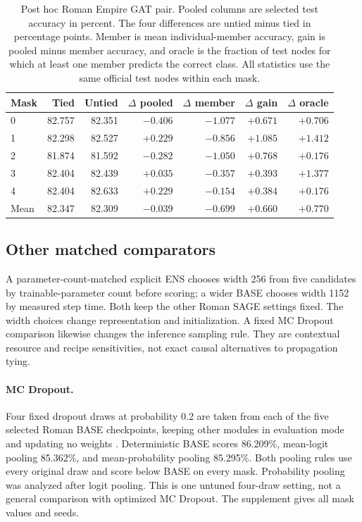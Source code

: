 \begin{table}[h]
\centering
\caption{Post hoc Roman Empire GAT pair. Pooled columns are selected test accuracy in percent. The four differences are untied minus tied in percentage points. Member is mean individual-member accuracy, gain is pooled minus member accuracy, and oracle is the fraction of test nodes for which at least one member predicts the correct class. All statistics use the same official test nodes within each mask.}
\label{tab:gat-pair}
\setlength{\tabcolsep}{4pt}
\small
\begin{tabular}{lrrrrrr}
\toprule
Mask & Tied & Untied & $\Delta$ pooled & $\Delta$ member & $\Delta$ gain & $\Delta$ oracle\\
\midrule
0 & 82.757 & 82.351 & $-0.406$ & $-1.077$ & $+0.671$ & $+0.706$\\
1 & 82.298 & 82.527 & $+0.229$ & $-0.856$ & $+1.085$ & $+1.412$\\
2 & 81.874 & 81.592 & $-0.282$ & $-1.050$ & $+0.768$ & $+0.176$\\
3 & 82.404 & 82.439 & $+0.035$ & $-0.357$ & $+0.393$ & $+1.377$\\
4 & 82.404 & 82.633 & $+0.229$ & $-0.154$ & $+0.384$ & $+0.176$\\
\midrule
Mean & 82.347 & 82.309 & $-0.039$ & $-0.699$ & $+0.660$ & $+0.770$\\
\bottomrule
\end{tabular}
\end{table}

\subsection{Other matched comparators}\label{app:param-matched}
A parameter-count-matched explicit ENS chooses width 256 from five
candidates by trainable-parameter count before scoring; a wider BASE
chooses width 1152 by measured step time. Both keep the other Roman
SAGE settings fixed. The width choices change representation and
initialization. A fixed MC Dropout comparison likewise changes the
inference sampling rule. They are contextual resource and recipe
sensitivities, not exact causal alternatives to propagation tying.
\label{app:mc-dropout}\label{app:strong-base}

\paragraph{MC Dropout.}
Four fixed dropout draws at probability 0.2 are taken from each of the
five selected Roman BASE checkpoints, keeping other modules in evaluation
mode and updating no weights \citep{gal2016dropout}. Deterministic BASE
scores 86.209\%, mean-logit pooling 85.362\%, and mean-probability pooling
85.295\%. Both pooling rules use every original draw and score below
BASE on every mask. Probability pooling was analyzed after logit pooling.
This is one untuned four-draw setting, not a general comparison with
optimized MC Dropout. The supplement gives all mask values and seeds.

